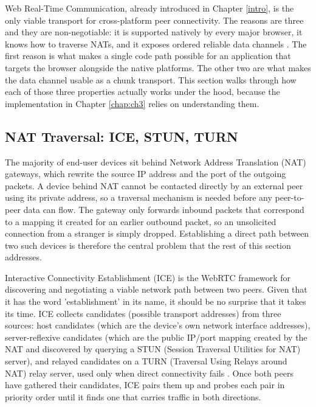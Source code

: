 \indent \par Web Real-Time Communication, already introduced in Chapter \ref{intro}, is the only viable transport for cross-platform peer connectivity. The reasons are three and they are non-negotiable: it is supported natively by every major browser, it knows how to traverse NATs, and it exposes ordered reliable data channels \cite{latency_and_reliability}. The first reason is what makes a single code path possible for an application that targets the browser alongside the native platforms. The other two are what makes the data channel usable as a chunk transport. This section walks through how each of those three properties actually works under the hood, because the implementation in Chapter \ref{chap:ch3} relies on understanding them.

\subsection{NAT Traversal: ICE, STUN, TURN}
\label{subsec:nat-traversal}

\indent \par The majority of end-user devices sit behind Network Address Translation (NAT) gateways, which rewrite the source IP address and the port of the outgoing packets. A device behind NAT cannot be contacted directly by an external peer using its private address, so a traversal mechanism is needed before any peer-to-peer data can flow. The gateway only forwards inbound packets that correspond to a mapping it created for an earlier outbound packet, so an unsolicited connection from a stranger is simply dropped. Establishing a direct path between two such devices is therefore the central problem that the rest of this section addresses.

\par Interactive Connectivity Establishment (ICE) is the WebRTC framework for discovering and negotiating a viable network path between two peers. Given that it has the word 'establishment' in its name, it should be no surprise that it takes its time. ICE collects candidates (possible transport addresses) from three sources: host candidates (which are the device's own network interface addresses), server-reflexive candidates (which are the public IP/port mapping created by the NAT and discovered by querying a STUN (Session Traversal Utilities for NAT) server), and relayed candidates on a TURN (Traversal Using Relays around NAT) relay server, used only when direct connectivity fails \cite{relays_turn}. Once both peers have gathered their candidates, ICE pairs them up and probes each pair in priority order until it finds one that carries traffic in both directions.

